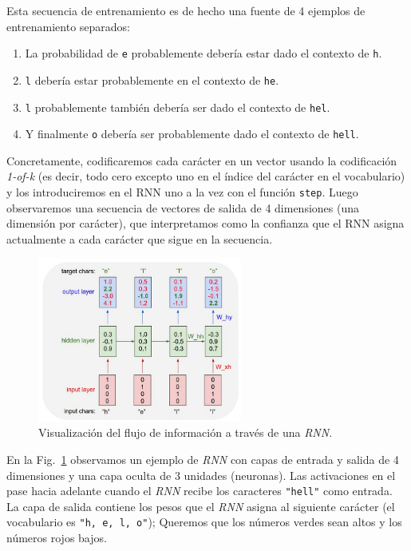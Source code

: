 \documentclass[a4paper,12pt]{article}
\begin{document}
Esta secuencia de entrenamiento es de hecho una fuente de 4 ejemplos de entrenamiento separados: 
\begin{enumerate}[noitemsep, topsep=2pt]
	\item La probabilidad de \texttt{e} probablemente debería estar dado el contexto de \texttt{h}.
	\item \texttt{l} debería estar probablemente en el contexto de \texttt{he}.
	\item \texttt{l} probablemente también debería ser dado el contexto de \texttt{hel}.
	\item  Y finalmente \texttt{o} debería ser probablemente dado el contexto de \texttt{hell}.
\end{enumerate}

Concretamente, codificaremos cada carácter en un vector usando la codificación \textit{1-of-k} (es decir, todo cero excepto uno en el índice del carácter en el vocabulario) y los introduciremos en el RNN uno a la vez con el función \texttt{step}. Luego observaremos una secuencia de vectores de salida de 4 dimensiones (una dimensión por carácter), que interpretamos como la confianza que el RNN asigna actualmente a cada carácter que sigue en la secuencia. 

\begin{figure}[H]
	\begin{center}				
		\includegraphics[width=0.6\textwidth]{tesis_29.png}
		\caption{Visualización del flujo de información a través de una \textit{RNN}. \citep{karpathy:rnn}}
		\label{fig:rnnexample}
	\end{center}
\end{figure}

En la Fig.~\ref{fig:rnnexample} observamos un ejemplo de \textit{RNN} con capas de entrada y salida de 4 dimensiones y una capa oculta de 3 unidades (neuronas). Las activaciones en el pase hacia adelante cuando el \textit{RNN} recibe los caracteres \texttt{"hell"} como entrada. La capa de salida contiene los pesos que el \textit{RNN} asigna al siguiente carácter (el vocabulario es \texttt{"h, e, l, o"}); Queremos que los números verdes sean altos y los números rojos bajos.
\end{document}
